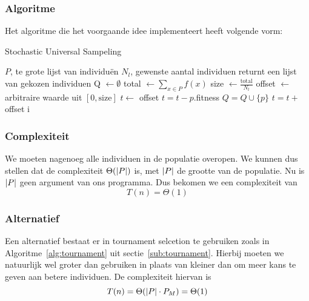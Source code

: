 \subsubsection{Algoritme}
Het algoritme die het voorgaande idee implementeert heeft volgende vorm:
	\begin{algorithm}[H]
	 	\caption{Stochastic Universal Sampeling}
		\begin{algorithmic}
		\Require 
			\State $P$, te grote lijst van individuën 
			\State $N_l$, gewenste aantal individuen
		\Ensure returnt een lijst van gekozen individuen
		\State Q $\gets \emptyset$
		\State total $\gets \sum_{x \in P} f(x)$ 
		\State size $\gets \frac{\text{total}}{N_l}$
		\State offset $\gets$ arbitraire waarde uit $\left\lbrack 0,\text{size} \right\rbrack$
		\State $t \gets$ offset
		\State $t = t-p.$fitness
			\State $Q = Q \cup \lbrace p \rbrace$
			\State $t = t+$offset
		\EndIf
		\EndFor		
		\State \Return i
		\EndFunction

		
		\end{algorithmic}
		\label{alg:SUS}
	\end{algorithm}		

\subsubsection{Complexiteit}
\label{ssub:SUSComplexity}
We moeten nagenoeg alle individuen in de populatie overopen. We kunnen dus stellen dat de complexiteit $ \Theta(\lvert P \rvert)$ is, met $\lvert P \rvert$ de grootte van de populatie. Nu is $\lvert P \rvert$ geen argument van ons programma. Dus bekomen we een complexiteit van \[T(n) = \Theta(1)\]

\subsubsection{Alternatief}
\label{sec:positiveTournament}
Een alternatief bestaat er in tournament selcetion te gebruiken zoals in Algoritme~\ref{alg:tournament} uit sectie~\ref{sub:tournament}. Hierbij moeten we natuurlijk wel groter dan gebruiken in plaats van kleiner dan om meer kans te geven aan betere individuen. De complexiteit hiervan is  \[T(n) = \Theta(\lvert P \rvert \cdot P_M) = \Theta(1)\]

%